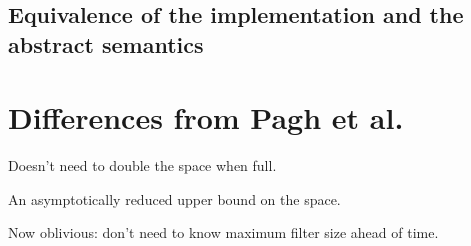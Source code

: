 \documentclass[11pt,letterpaper]{article}
\begin{document}






\subsection{Equivalence of the implementation and the abstract semantics}

\section{Differences from Pagh et al.}

Doesn't need to double the space when full.

An asymptotically reduced upper bound on the space.

Now oblivious: don't need to know maximum filter size ahead of time.

{}

\end{document}
